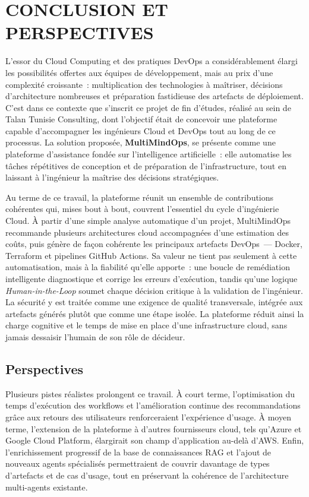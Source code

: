 \chapter*{CONCLUSION ET PERSPECTIVES}
\adjustmtc
\thispagestyle{MyStyle}

L'essor du Cloud Computing et des pratiques DevOps a considérablement élargi les
possibilités offertes aux équipes de développement, mais au prix d'une complexité
croissante~: multiplication des technologies à maîtriser, décisions d'architecture
nombreuses et préparation fastidieuse des artefacts de déploiement. C'est dans ce contexte
que s'inscrit ce projet de fin d'études, réalisé au sein de Talan Tunisie Consulting, dont
l'objectif était de concevoir une plateforme capable d'accompagner les ingénieurs Cloud et
DevOps tout au long de ce processus. La solution proposée, \textbf{MultiMindOps}, se
présente comme une plateforme d'assistance fondée sur l'intelligence artificielle~: elle
automatise les tâches répétitives de conception et de préparation de l'infrastructure, tout
en laissant à l'ingénieur la maîtrise des décisions stratégiques.

Au terme de ce travail, la plateforme réunit un ensemble de contributions cohérentes qui,
mises bout à bout, couvrent l'essentiel du cycle d'ingénierie Cloud. À partir d'une simple
analyse automatique d'un projet, MultiMindOps recommande plusieurs architectures cloud
accompagnées d'une estimation des coûts, puis génère de façon cohérente les principaux
artefacts DevOps~--- Docker, Terraform et pipelines GitHub Actions. Sa valeur ne tient pas
seulement à cette automatisation, mais à la fiabilité qu'elle apporte~: une boucle de
remédiation intelligente diagnostique et corrige les erreurs d'exécution, tandis qu'une
logique \textit{Human-in-the-Loop} soumet chaque décision critique à la validation de
l'ingénieur. La sécurité y est traitée comme une exigence de qualité transversale, intégrée
aux artefacts générés plutôt que comme une étape isolée. La plateforme réduit ainsi la
charge cognitive et le temps de mise en place d'une infrastructure cloud, sans jamais
dessaisir l'humain de son rôle de décideur.

\section*{Perspectives}

Plusieurs pistes réalistes prolongent ce travail. À court terme, l'optimisation du temps
d'exécution des workflows et l'amélioration continue des recommandations grâce aux retours
des utilisateurs renforceraient l'expérience d'usage. À moyen terme, l'extension de la
plateforme à d'autres fournisseurs cloud, tels qu'Azure et Google Cloud Platform,
élargirait son champ d'application au-delà d'AWS. Enfin, l'enrichissement progressif de la
base de connaissances RAG et l'ajout de nouveaux agents spécialisés permettraient de couvrir
davantage de types d'artefacts et de cas d'usage, tout en préservant la cohérence de
l'architecture multi-agents existante.
